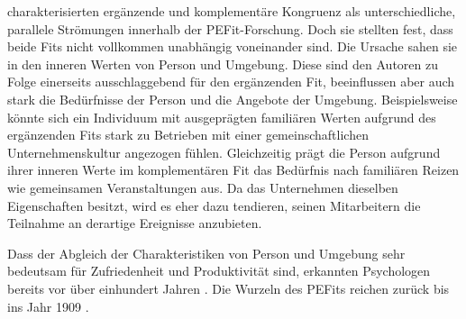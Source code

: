 \textcite[S. 1ff.]{edwards:2004} charakterisierten ergänzende und komplementäre Kongruenz als unterschiedliche, parallele Strömungen innerhalb der \ac{PEFit}-Forschung. Doch sie stellten fest, dass beide Fits nicht vollkommen unabhängig voneinander sind. Die Ursache sahen sie in den inneren Werten von Person und Umgebung. Diese sind den Autoren zu Folge einerseits ausschlaggebend für den ergänzenden Fit, beeinflussen aber auch stark die Bedürfnisse der Person und die Angebote der Umgebung. Beispielsweise könnte sich ein Individuum mit ausgeprägten familiären Werten aufgrund des ergänzenden Fits stark zu Betrieben mit einer gemeinschaftlichen Unternehmenskultur angezogen fühlen. Gleichzeitig prägt die Person aufgrund ihrer inneren Werte im komplementären Fit das Bedürfnis nach familiären Reizen wie gemeinsamen Veranstaltungen aus. Da das Unternehmen dieselben Eigenschaften besitzt, wird es eher dazu tendieren, seinen Mitarbeitern die Teilnahme an derartige Ereignisse anzubieten.

Dass der Abgleich der Charakteristiken von Person und Umgebung sehr bedeutsam für Zufriedenheit und Produktivität sind, erkannten Psychologen bereits vor über einhundert Jahren \cite[S. 5ff.]{parsons:1909}. Die Wurzeln des \acp{PEFit} reichen zurück bis ins Jahr 1909 \cite[S. 1]{su:2015}.

